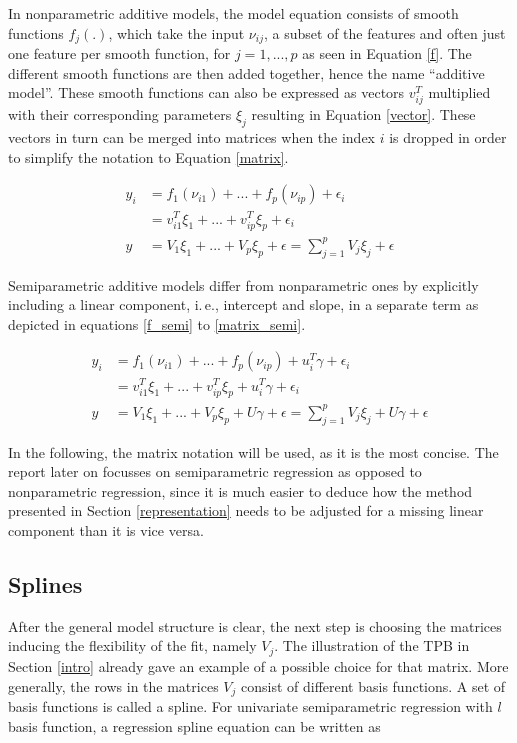 \documentclass[12pt]{article}
\begin{document}
In nonparametric additive models, the model equation consists of smooth functions $f_j(.)$, which take the input $\nu_{ij}$, a subset of the features and often just one feature per smooth function, for $j = 1,...,p$ as seen in Equation \ref{f}. 
The different smooth functions are then added together, hence the name ``additive model''.
These smooth functions can also be expressed as vectors $v^T_{ij}$  multiplied with their corresponding parameters $\xi_j$ resulting in Equation \ref{vector}. These vectors in turn can be merged into matrices when the index $i$ is dropped in order to simplify the notation to Equation   \ref{matrix}.

\begin{align}
y_i &= f_1(\nu_{i1}) + ... + f_p(\nu_{ip})+\epsilon_i \label{f}\\
&=  v^T_{i1}\xi_1 + ... + v^T_{ip}\xi_p+\epsilon_i \label{vector} \\
y &= V_1\xi_1 + ... + V_p\xi_p +\epsilon= \sum_{j=1}^p V_j\xi_j +\epsilon \label{matrix}
\end{align}

Semiparametric additive models differ from nonparametric ones by explicitly including a linear component, i.\,e., intercept and slope, in a separate term as depicted in equations \ref{f_semi} to \ref{matrix_semi}.

\begin{align}
y_i &= f_1(\nu_{i1}) + ... + f_p(\nu_{ip})+ u^T_i\gamma+\epsilon_i\label{f_semi}\\
&=  v^T_{i1}\xi_1 + ... + v^T_{ip}\xi_p+ u^T_i\gamma+\epsilon_i\label{vector_semi} \\
y&= V_1\xi_1 + ... + V_p\xi_p + U\gamma +\epsilon= \sum_{j=1}^p V_j\xi_j + U\gamma+\epsilon\label{matrix_semi}
\end{align}

In the following, the matrix notation will be used, as it is the most concise.
The report later on focusses on semiparametric regression as opposed to nonparametric regression, since it is much easier to deduce how the method presented in Section \ref{representation} needs to be adjusted for a missing linear component than it is vice versa.

\subsection{Splines}



After the general model structure is clear, the next step is choosing the matrices inducing the flexibility of the fit, namely $V_j$.
The illustration of the TPB in Section \ref{intro} already gave an example of a possible choice for that matrix. More generally, the rows in the matrices $V_j$ consist of different basis functions. A set of basis functions is called a spline. For univariate semiparametric regression with $l$ basis function, a regression spline equation can be written as   
\end{document}

